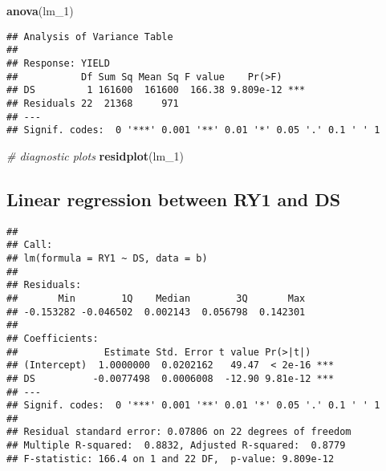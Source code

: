 \documentclass[]{book}
\newenvironment{Shaded}{\begin{snugshade}}{\end{snugshade}}
\newcommand{\CommentTok}[1]{\textcolor[rgb]{0.56,0.35,0.01}{\textit{#1}}}
\newcommand{\DataTypeTok}[1]{\textcolor[rgb]{0.13,0.29,0.53}{#1}}
\newcommand{\DecValTok}[1]{\textcolor[rgb]{0.00,0.00,0.81}{#1}}
\newcommand{\FloatTok}[1]{\textcolor[rgb]{0.00,0.00,0.81}{#1}}
\newcommand{\KeywordTok}[1]{\textcolor[rgb]{0.13,0.29,0.53}{\textbf{#1}}}
\newcommand{\NormalTok}[1]{#1}
\newcommand{\OperatorTok}[1]{\textcolor[rgb]{0.81,0.36,0.00}{\textbf{#1}}}
\newcommand{\StringTok}[1]{\textcolor[rgb]{0.31,0.60,0.02}{#1}}
\begin{document}
\begin{Shaded}
\begin{Highlighting}[]
\KeywordTok{anova}\NormalTok{(lm_}\DecValTok{1}\NormalTok{)}
\end{Highlighting}
\end{Shaded}

\begin{verbatim}
## Analysis of Variance Table
## 
## Response: YIELD
##           Df Sum Sq Mean Sq F value    Pr(>F)    
## DS         1 161600  161600  166.38 9.809e-12 ***
## Residuals 22  21368     971                      
## ---
## Signif. codes:  0 '***' 0.001 '**' 0.01 '*' 0.05 '.' 0.1 ' ' 1
\end{verbatim}

\begin{Shaded}
\begin{Highlighting}[]
\CommentTok{# diagnostic plots  }
\KeywordTok{residplot}\NormalTok{(lm_}\DecValTok{1}\NormalTok{)}
\end{Highlighting}
\end{Shaded}

\hypertarget{linear-regression-between-ry1-and-ds}{%
\subsection{Linear regression between RY1 and DS}\label{linear-regression-between-ry1-and-ds}}

\begin{Shaded}
\end{Shaded}

\begin{verbatim}
## 
## Call:
## lm(formula = RY1 ~ DS, data = b)
## 
## Residuals:
##       Min        1Q    Median        3Q       Max 
## -0.153282 -0.046502  0.002143  0.056798  0.142301 
## 
## Coefficients:
##               Estimate Std. Error t value Pr(>|t|)    
## (Intercept)  1.0000000  0.0202162   49.47  < 2e-16 ***
## DS          -0.0077498  0.0006008  -12.90 9.81e-12 ***
## ---
## Signif. codes:  0 '***' 0.001 '**' 0.01 '*' 0.05 '.' 0.1 ' ' 1
## 
## Residual standard error: 0.07806 on 22 degrees of freedom
## Multiple R-squared:  0.8832, Adjusted R-squared:  0.8779 
## F-statistic: 166.4 on 1 and 22 DF,  p-value: 9.809e-12
\end{verbatim}
\end{document}
